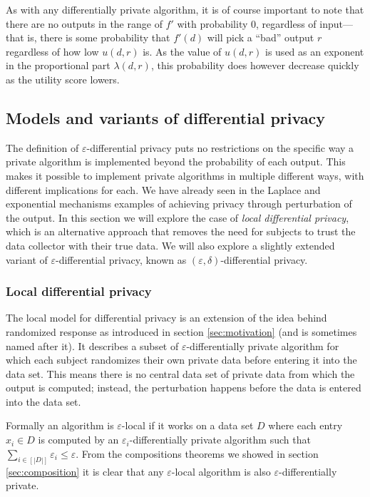 \documentclass[12pt]{article}
\renewcommand{\epsilon}{\varepsilon}
\begin{document}
As with any differentially private algorithm, it is of course important to note that there are no outputs in the range of $f'$ with probability 0, regardless of input---that is, there is some probability that $f'(d)$ will pick a ``bad'' output $r$ regardless of how low $u(d, r)$ is. As the value of $u(d,r)$ is used as an exponent in the proportional part $\lambda(d,r)$, this probability does however decrease quickly as the utility score lowers.

\subsection{Models and variants of differential privacy \label{sec:variants}}

The definition of $\epsilon$-differential privacy puts no restrictions on the specific way a private algorithm is implemented beyond the probability of each output. This makes it possible to implement private algorithms in multiple different ways, with different implications for each. We have already seen in the Laplace and exponential mechanisms examples of achieving privacy through perturbation of the output. In this section we will explore the case of \emph{local differential privacy}, which is an alternative approach that removes the need for subjects to trust the data collector with their true data. We will also explore a slightly extended variant of $\epsilon$-differential privacy, known as $(\epsilon,\delta)$-differential privacy.

\subsubsection{Local differential privacy}

The local model for differential privacy \cite{kasiv_localdiff} is an extension of the idea behind randomized response as introduced in section \ref{sec:motivation} (and is sometimes named after it). It describes a subset of $\epsilon$-differentially private algorithm for which each subject randomizes their own private data before entering it into the data set. This means there is no central data set of private data from which the output is computed; instead, the perturbation happens before the data is entered into the data set.

Formally an algorithm is $\epsilon$-local if it works on a data set $D$ where each entry $x_i \in D$ is computed by an $\epsilon_i$-differentially private algorithm such that $\sum_{i\in\left[|D|\right]} \epsilon_i \leq \epsilon$. From the compositions theorems we showed in section \ref{sec:composition} it is clear that any $\epsilon$-local algorithm is also $\epsilon$-differentially private.
\end{document}
